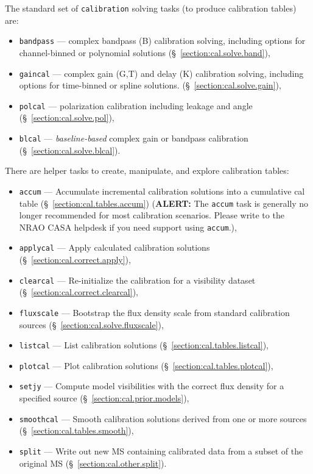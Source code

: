 The standard set of {\tt calibration} solving tasks (to produce
calibration tables) are:
\begin{itemize}
   \item {\tt bandpass} --- complex bandpass (B) calibration solving,
      including options for channel-binned or polynomial solutions
      (\S~\ref{section:cal.solve.band}),
   \item {\tt gaincal} --- complex gain (G,T) and delay (K)
     calibration solving, including options for time-binned or spline
     solutions.  
      (\S~\ref{section:cal.solve.gain}),
   \item {\tt polcal} --- polarization calibration including leakage
      and angle
      (\S~\ref{section:cal.solve.pol}),
   \item {\tt blcal} --- {\it baseline-based} complex gain or bandpass
      calibration
      (\S~\ref{section:cal.solve.blcal}).
\end{itemize}

There are helper tasks to create, manipulate, and explore calibration 
tables:
\begin{itemize}
   \item {\tt accum} --- Accumulate incremental calibration solutions
      into a cumulative cal table (\S~\ref{section:cal.tables.accum})
      ({\bf ALERT:} The {\tt accum} task is generally no longer recommended
      for most calibration scenarios.  Please write to the NRAO CASA
      helpdesk  if you need support using {\tt accum}.),
   \item {\tt applycal} --- Apply calculated calibration solutions
      (\S~\ref{section:cal.correct.apply}),
   \item {\tt clearcal} --- Re-initialize the calibration for a
     visibility dataset (\S~\ref{section:cal.correct.clearcal}),
   \item {\tt fluxscale} --- Bootstrap the flux density scale from
      standard calibration sources (\S~\ref{section:cal.solve.fluxscale}), 
   \item {\tt listcal} --- List calibration solutions 
      (\S~\ref{section:cal.tables.listcal}),
   \item {\tt plotcal} --- Plot calibration solutions 
      (\S~\ref{section:cal.tables.plotcal}),
    \item {\tt setjy} --- Compute model visibilities with the correct
      flux density for a specified source
      (\S~\ref{section:cal.prior.models}),
   \item {\tt smoothcal} --- Smooth calibration solutions derived from
      one or more sources (\S~\ref{section:cal.tables.smooth}),
   \item {\tt split} --- Write out new MS containing calibrated data
      from a subset of the original MS (\S~\ref{section:cal.other.split}).
\end{itemize}

